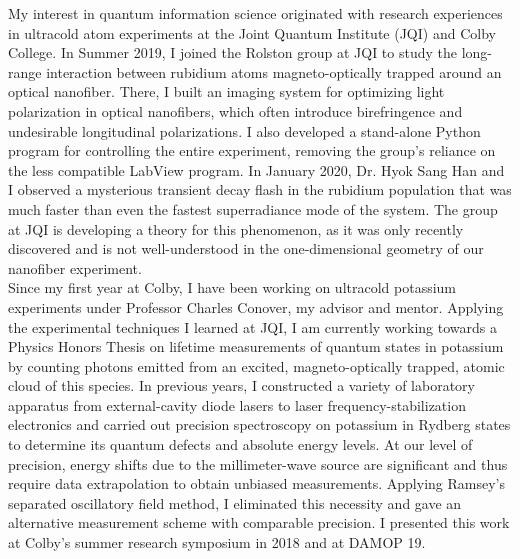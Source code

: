 \documentclass[12pt]{article}
\begin{document}
My interest in quantum information science originated with research experiences in ultracold atom experiments at the Joint Quantum Institute (JQI) and Colby College. In Summer 2019, I joined the Rolston group at JQI to study the long-range interaction between rubidium atoms magneto-optically trapped around an optical nanofiber. There, I built an imaging system for optimizing light polarization in optical nanofibers, which often introduce birefringence and undesirable longitudinal polarizations. I also developed a stand-alone Python program for controlling the entire experiment, removing the group's reliance on the less compatible LabView program. In January 2020, Dr. Hyok Sang Han and I observed a mysterious transient decay flash in the rubidium population that was much faster than even the fastest superradiance mode of the system.  The group at JQI is developing a theory for this phenomenon, as it was only recently discovered and is not well-understood in the one-dimensional geometry of our nanofiber experiment.   \\ 

Since my first year at Colby, I have been working on ultracold potassium experiments under Professor Charles Conover, my advisor and mentor. Applying the experimental techniques I learned at JQI, I am currently working towards a Physics Honors Thesis on lifetime measurements of quantum states in potassium by counting photons emitted from an excited, magneto-optically trapped, atomic cloud of this species. In previous years, I constructed a variety of laboratory apparatus from external-cavity diode lasers to laser frequency-stabilization electronics and carried out precision spectroscopy on potassium in Rydberg states to determine its quantum defects and absolute energy levels. At our level of precision, energy shifts due to the millimeter-wave source are significant and thus require data extrapolation to obtain unbiased measurements. Applying Ramsey's separated oscillatory field method, I eliminated this necessity and gave an alternative measurement scheme with comparable precision. I presented this work at Colby's summer research symposium in 2018 and at DAMOP 19.  \\
\end{document}

